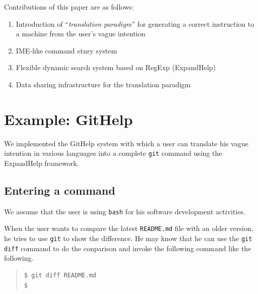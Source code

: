 \documentclass{sigchi}
\def\GH{\textsf{GitHelp}}
\def\EH{\textsf{ExpandHelp}}
\begin{document}
Contributions of this paper are as follows:

\begin{enumerate}
\item Introduction of ``\textit{translation paradigm}'' for
  generating a correct instruction to a machine from
  the user's vague intention
\item IME-like command etnry system
\item Flexible dynamic search system based on RegExp (ExpandHelp)
\item Data sharing infrastructure for the translation paradigm
\end{enumerate}

\section{Example: GitHelp}

We implemented the {\GH} system
with which a user can translate his vague intention in various languages
into a complete \texttt{git} command
using the {\EH} framework.

\subsection{Entering a command}

We assume that the user is using \texttt{bash} for his software
development activities.


When the user wants to compare the latest \texttt{README.md} file with an
older version, he tries to use \texttt{git} to show the difference.
He may know that he can use the \texttt{git diff} command to do the
conparison and invoke the following command like the following.

\begin{quotation}
\begin{verbatim}
$ git diff README.md
$
\end{verbatim}
\end{quotation}
\end{document}

